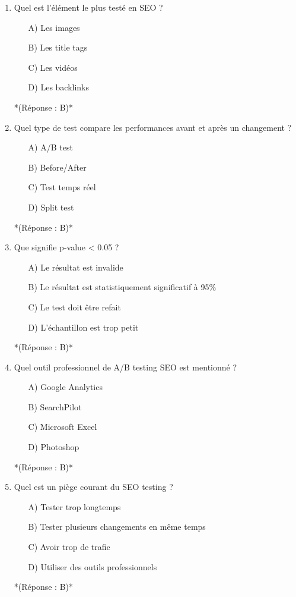 \documentclass[12pt,a4paper,twoside]{report}
\begin{document}
\begin{enumerate}
    \item Quel est l'élément le plus testé en SEO ?
    \begin{itemize}
        \item[A)] Les images
        \item[B)] Les title tags
        \item[C)] Les vidéos
        \item[D)] Les backlinks
    \end{itemize}
    *(Réponse : B)*

    \item Quel type de test compare les performances avant et après un changement ?
    \begin{itemize}
        \item[A)] A/B test
        \item[B)] Before/After
        \item[C)] Test temps réel
        \item[D)] Split test
    \end{itemize}
    *(Réponse : B)*

    \item Que signifie p-value < 0.05 ?
    \begin{itemize}
        \item[A)] Le résultat est invalide
        \item[B)] Le résultat est statistiquement significatif à 95\%
        \item[C)] Le test doit être refait
        \item[D)] L'échantillon est trop petit
    \end{itemize}
    *(Réponse : B)*

    \item Quel outil professionnel de A/B testing SEO est mentionné ?
    \begin{itemize}
        \item[A)] Google Analytics
        \item[B)] SearchPilot
        \item[C)] Microsoft Excel
        \item[D)] Photoshop
    \end{itemize}
    *(Réponse : B)*

    \item Quel est un piège courant du SEO testing ?
    \begin{itemize}
        \item[A)] Tester trop longtemps
        \item[B)] Tester plusieurs changements en même temps
        \item[C)] Avoir trop de trafic
        \item[D)] Utiliser des outils professionnels
    \end{itemize}
    *(Réponse : B)*


\end{enumerate}
\end{document}
